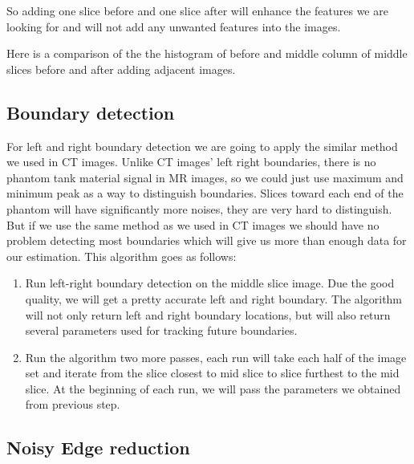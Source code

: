 So adding one slice before and one slice after will enhance the features we are looking for and will not 
add any unwanted features into the images.

Here is a comparison of the the histogram of before and middle column of middle slices before and after 
adding adjacent images.


\subsection{Boundary detection}

For left and right boundary detection we are going to apply the similar method we used in CT images. 
Unlike CT images' left right boundaries, there is no phantom tank material signal in MR images, 
so we could just use maximum and minimum peak as a way to distinguish boundaries. Slices toward each end
of the phantom will have significantly more noises, they are very hard to distinguish. But if we use the same
method as we used in CT images we should have no problem detecting most boundaries which will give us more
than enough data for our estimation. This algorithm goes as follows:

\begin{enumerate}
  \item Run left-right boundary detection on the middle slice image. Due the good quality, we will get a 
    pretty accurate left and right boundary. The algorithm will not only return left and right boundary
    locations, but will also return several parameters used for tracking future boundaries.
  \item Run the algorithm two more passes, each run will take each half of the image set and iterate from
    the slice closest to mid slice to slice furthest to the mid slice. At the beginning of each run, we will
    pass the parameters we obtained from previous step.
\end{enumerate}

\subsection{Noisy Edge reduction}

